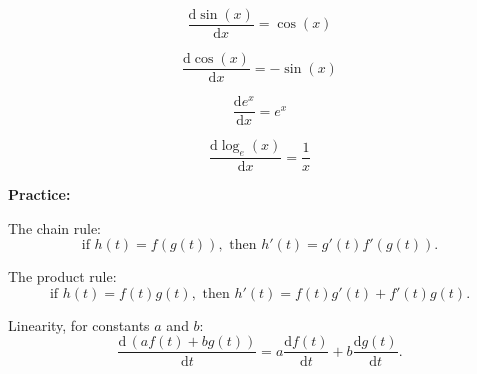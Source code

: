 \documentclass{article}
\newcommand{\deriv}[2]{\frac{\mathrm{d}#1}{\mathrm{d}#2}}
\begin{document}
\vfill

\[\deriv{\sin(x)}{x}=\cos(x)\]

\vfill

\[\deriv{\cos(x)}{x}=-\sin(x)\]

\vfill

\[\deriv{e^x}{x}=e^x\]

\vfill

\[\deriv{\log_e(x)}{x}=\frac{1}{x}\]





\clearpage





\textbf{Practice:}

\vspace{5mm}

The chain rule:
\[\mbox{if } h(t)=f(g(t)),\mbox{ then } h'(t)=g'(t)f'(g(t)).\]

The product rule:
\[\mbox{if } h(t)=f(t)g(t),\mbox{ then } h'(t)=f(t)g'(t)+f'(t)g(t).\]

Linearity, for constants $a$ and $b$:
\[\deriv{\,(af(t)+bg(t))}{t}=a\deriv{f(t)}{t}+b\deriv{g(t)}{t}.\]
\end{document}

